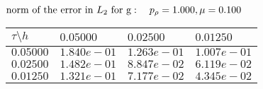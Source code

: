 $
 \text{norm of the error in $L_2$ for g}: \quad p_{\rho}=1.000, \mu = 0.100 \\ $
\begin{tabular}{|p{0.6in}|p{1.2in}|p{1.2in}|p{1.2in}|} \hline
$\tau\setminus h$ & $0.05000$ & $0.02500$& $0.01250$ \\ \hline
$0.05000$ & $1.840e-01$ &$1.263e-01$ &$1.007e-01$  \\ \hline
$0.02500$ & $1.482e-01$ &$8.847e-02$ &$6.119e-02$  \\ \hline
$0.01250$ & $1.321e-01$ &$7.177e-02$ &$4.345e-02$  \\ \hline
\end{tabular}\\[20pt]

